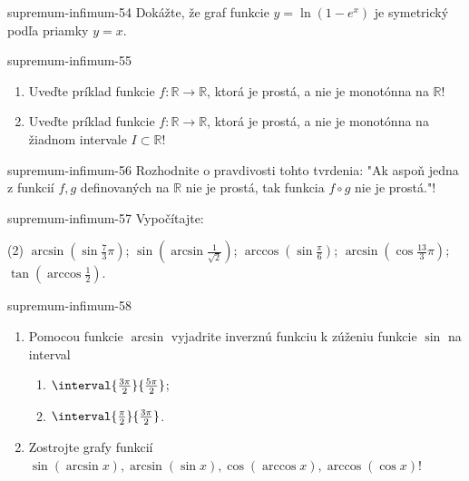 \begin{defproblem}{supremum-infimum-54}
Dokážte, že graf funkcie $y=\ln (1-e^x)$ je symetrický podľa priamky $y=x$.
\end{defproblem}

\begin{defproblem}{supremum-infimum-55}
\begin{enumerate}
\item Uveďte príklad funkcie $f:\mathbb{R}\rightarrow\mathbb{R}$, ktorá je prostá, a nie je monotónna na $\mathbb{R}$!
\item Uveďte príklad funkcie $f:\mathbb{R}\rightarrow\mathbb{R}$, ktorá je prostá, a nie je monotónna na žiadnom intervale $I\subset\mathbb{R}$!
\end{enumerate}
\end{defproblem}

\begin{defproblem}{supremum-infimum-56}
Rozhodnite o pravdivosti tohto tvrdenia: "Ak aspoň jedna z funkcií $f,g$
definovaných na $\mathbb{R}$ nie je prostá, tak funkcia $f\circ g$ nie je
prostá."!
\end{defproblem}

\begin{defproblem}{supremum-infimum-57}
Vypočítajte:
\begin{tasks}(2)
  \task $\arcsin(\sin \frac{7}{3}\pi)$;
  \task $\sin(\arcsin \frac{1}{\sqrt{2}})$;
  \task $\arccos(\sin \frac{\pi}{6})$;
  \task $\arcsin(\cos \frac{13}{3}\pi)$;
  \task $\tan(\arccos\frac{1}{2})$.
\end{tasks}
\end{defproblem}

\begin{defproblem}{supremum-infimum-58}
\begin{enumerate}
\item Pomocou funkcie $\arcsin$ vyjadrite inverznú funkciu k zúženiu funkcie $\sin$ na interval
\begin{enumerate}
  \item $\interval{\frac{3\pi}{2}}{\frac{5\pi}{2}}$;
  \item $\interval{\frac{\pi}{2}}{\frac{3\pi}{2}}$.
\end{enumerate}
\item Zostrojte grafy funkcií $\sin(\arcsin x),\arcsin(\sin x),\cos(\arccos x),\arccos(\cos x)$!
\end{enumerate}
\end{defproblem}

